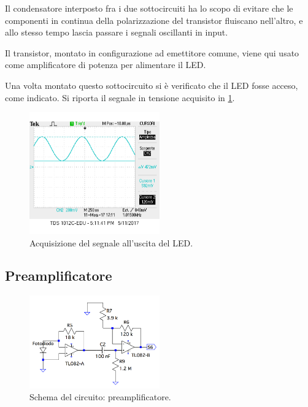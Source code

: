 \documentclass[a4paper,10pt]{article}
\begin{document}
Il condensatore interposto fra i due sottocircuiti ha lo scopo di evitare che le componenti in continua della polarizzazione del transistor fluiscano nell'altro, e allo stesso tempo lascia passare i segnali oscillanti in input.

Il transistor, montato in configurazione ad emettitore comune, viene qui usato come amplificatore di potenza per alimentare il LED.
\newline

Una volta montato questo sottocircuito si è verificato che il LED fosse acceso, come indicato.
Si riporta il segnale in tensione acquisito in \cref{fig:LED}.

\begin{figure}[H]
	\centering
	\includegraphics[width=0.5\textwidth]{../grafici/ledr4.png}
	\caption{Acquisizione del segnale all'uscita del LED.}
	\label{fig:LED}
\end{figure}

\subsection{Preamplificatore}

\begin{figure}
	\vspace{-10pt}
	\centering
	\includegraphics[width=0.5\textwidth]{../grafici/PreAmp.png}
	\vspace{-12pt}
	\caption{Schema del circuito: preamplificatore.}
	\label{fig:preamp}
	\vspace{-12pt}
\end{figure}
\end{document}
